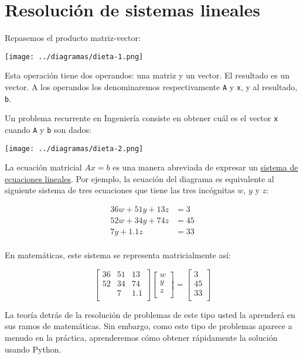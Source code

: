 \chapter{Resolución de sistemas lineales}

Repasemos el producto matriz-vector:

\texttt{[image: ../diagramas/dieta-1.png]}

Esta operación tiene dos operandos: una matriz y un vector. El resultado
es un vector. A los operandos los denominaremos respectivamente
\lstinline!A! y \lstinline!x!, y al resultado, \lstinline!b!.

Un problema recurrente en Ingeniería consiste en obtener cuál es el
vector \lstinline!x! cuando \lstinline!A! y \lstinline!b! son dados:

\texttt{[image: ../diagramas/dieta-2.png]}

La ecuación matricial \(Ax = b\) es una manera abreviada de expresar un
\href{http://es.wikipedia.org/wiki/Sistema\_de\_ecuaciones\_lineales}{sistema
de ecuaciones lineales}. Por ejemplo, la ecuación del diagrama es
equivalente al siguiente sistema de tres ecuaciones que tiene las tres
incógnitas \(w\), \(y\) y \(z\):

\[\begin{align}
36w + 51y + 13z &= 3 \\
52w + 34y + 74z &= 45 \\
7y + 1.1z &= 33 \\
\end{align}\]

En matemáticas, este sistema se representa matricialmente así:

\[\begin{bmatrix}
36 & 51 & 13 \\
52 & 34 & 74 \\
&  7 & 1.1 \\
\end{bmatrix}
\begin{bmatrix}
w \\ y \\ z \\
\end{bmatrix}
=
\begin{bmatrix}
3 \\ 45 \\ 33 \\
\end{bmatrix}\]

La teoría detrás de la resolución de problemas de este tipo usted la
aprenderá en sus ramos de matemáticas. Sin embargo, como este tipo de
problemas aparece a menudo en la práctica, aprenderemos cómo obtener
rápidamente la solución usando Python.

